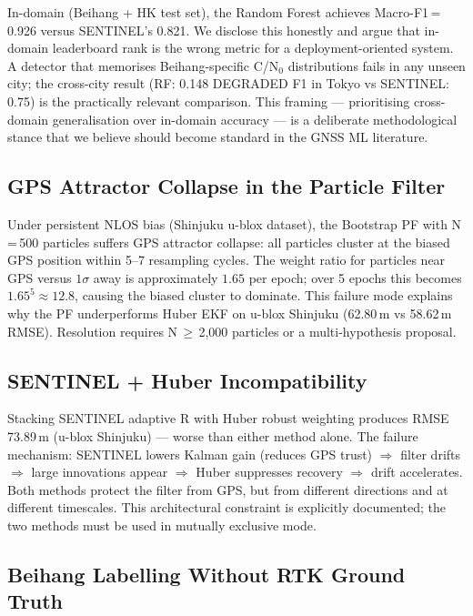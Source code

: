 \documentclass[12pt,a4paper]{article}
\begin{document}
In-domain (Beihang + HK test set), the Random Forest achieves Macro-F1\,=\,0.926
versus SENTINEL's 0.821.
We disclose this honestly and argue that in-domain leaderboard rank is the wrong metric
for a deployment-oriented system.
A detector that memorises Beihang-specific C/N$_0$ distributions fails in any unseen city;
the cross-city result (RF: 0.148 DEGRADED F1 in Tokyo vs SENTINEL: 0.75) is the
practically relevant comparison.
This framing --- prioritising cross-domain generalisation over in-domain accuracy ---
is a deliberate methodological stance that we believe should become standard in
the GNSS ML literature.

\subsection{GPS Attractor Collapse in the Particle Filter}

Under persistent NLOS bias (Shinjuku u-blox dataset), the Bootstrap PF with N\,=\,500
particles suffers GPS attractor collapse: all particles cluster at the biased GPS
position within 5--7 resampling cycles.
The weight ratio for particles near GPS versus $1\sigma$ away is approximately $1.65$
per epoch; over 5 epochs this becomes $1.65^5 \approx 12.8$, causing the biased cluster
to dominate.
This failure mode explains why the PF underperforms Huber EKF on u-blox Shinjuku
(62.80\,m vs 58.62\,m RMSE).
Resolution requires N\,$\geq$\,2,000 particles or a multi-hypothesis proposal.

\subsection{SENTINEL + Huber Incompatibility}

Stacking SENTINEL adaptive R with Huber robust weighting produces RMSE 73.89\,m (u-blox
Shinjuku) --- worse than either method alone.
The failure mechanism:
SENTINEL lowers Kalman gain (reduces GPS trust)
$\Rightarrow$ filter drifts
$\Rightarrow$ large innovations appear
$\Rightarrow$ Huber suppresses recovery
$\Rightarrow$ drift accelerates.
Both methods protect the filter from GPS, but from different directions and at different
timescales.
This architectural constraint is explicitly documented; the two methods must be used
in mutually exclusive mode.

\subsection{Beihang Labelling Without RTK Ground Truth}
\end{document}
